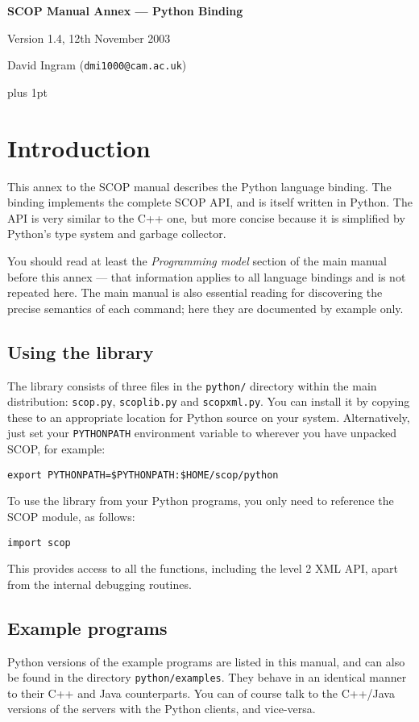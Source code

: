 \documentclass[12pt,a4paper,twoside]{article}
\renewcommand{\_}{\texttt{\symbol{95}}}
\begin{document}
\centerline{\textbf{\LARGE SCOP Manual Annex --- Python Binding}}
\vspace{0.5cm}
\centerline{Version 1.4, 12th November 2003}
\centerline{David Ingram (\texttt{dmi1000@cam.ac.uk})}

{ \parskip 1mm plus 1pt \tableofcontents }

\section{Introduction}

This annex to the SCOP manual describes the Python language binding.
The binding implements the complete SCOP API, and is
itself written in Python.
The API is very similar to the C++ one, but
more concise because it is
simplified by Python's type system and garbage collector.

You should read at least the \textit{Programming model} section of the main
manual before this annex --- that information applies to
all language bindings and is not repeated here. The main manual
is also essential reading for discovering the precise semantics of
each command; here they are documented by example only.

\subsection{Using the library}

The library consists of three files in the \texttt{python/} directory
within the main distribution: \texttt{scop.py}, \texttt{scoplib.py} and
\texttt{scopxml.py}. You can install it by copying these to an
appropriate location for Python source on your system. Alternatively,
just set your \texttt{PYTHONPATH} environment variable to wherever you
have unpacked SCOP, for example:

\texttt{export PYTHONPATH=\$PYTHONPATH:\$HOME/scop/python}

To use the library from your Python programs, you only
need to reference the SCOP module, as follows:

\texttt{import scop}

This provides access to all the functions, including the level 2 XML
API, apart from the internal debugging routines.

\subsection{Example programs}

Python versions of the example programs are listed in this manual, and
can also be found in the directory \texttt{python/examples}. They
behave in an identical manner to their C++ and Java counterparts. You
can of course talk to the C++/Java versions of the servers with the
Python clients, and vice-versa.
\end{document}
